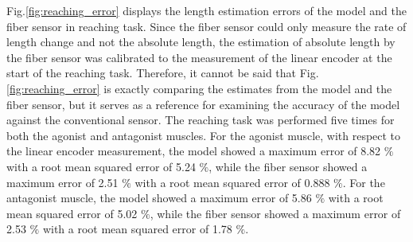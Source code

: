 Fig.\ref{fig:reaching_error} displays the length estimation errors of the model and the fiber sensor in reaching task. Since the fiber sensor could only measure the rate of length change and not the absolute length, the estimation of absolute length by the fiber sensor was calibrated to the measurement of the linear encoder at the start of the reaching task. Therefore, it cannot be said that Fig.\ref{fig:reaching_error} is exactly comparing the estimates from the model and the fiber sensor, but it serves as a reference for examining the accuracy of the model against the conventional sensor. The reaching task was performed five times for both the agonist and antagonist muscles. For the agonist muscle, with respect to the linear encoder measurement, the model showed a maximum error of 8.82 $\%$ with a root mean squared error of 5.24 $\%$, while the fiber sensor showed a maximum error of 2.51 $\%$ with a root mean squared error of 0.888 $\%$. For the antagonist muscle, the model showed a maximum error of 5.86 $\%$ with a root mean squared error of 5.02 $\%$, while the fiber sensor showed a maximum error of 2.53 $\%$ with a root mean squared error of 1.78 $\%$. 
\begin{table}[H]
    \centering
    \caption{Parameters for Length Estimation} 
    \label{tab:PAM_reflex}
\end{table}
